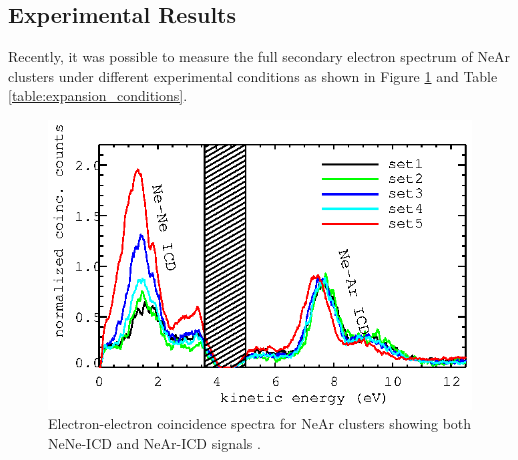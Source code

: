 \subsection{Experimental Results}
Recently, it was possible to measure the full secondary electron spectrum
of NeAr clusters under different experimental conditions as shown in Figure
\ref{figure:NeAr_exp_spectrum} and Table \ref{table:expansion_conditions}.

\begin{figure}[h]
  \centering
  \includegraphics[scale=1.7]{pics/exp_near_coinc_sets.eps}
  \caption{Electron-electron coincidence spectra for NeAr clusters
           showing both NeNe-ICD and NeAr-ICD signals \cite{Fasshauer14_1}.}
  \label{figure:NeAr_exp_spectrum}
\end{figure}

